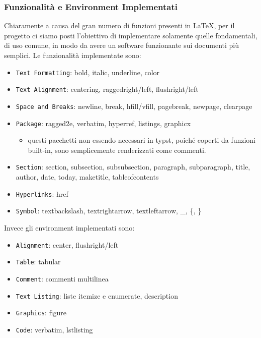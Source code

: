 \documentclass{article}
\begin{document}
    \subsubsection{Funzionalità e Environment Implementati}

    Chiaramente a causa del gran numero di funzioni presenti in LaTeX, per il progetto ci siamo posti l'obiettivo di implementare solamente quelle fondamentali, di uso comune, in modo da avere un software funzionante sui documenti più semplici.
    Le funzionalità implementate sono:
    \begin{itemize}
        \item \texttt{Text Formatting}: bold, italic, underline, color
        \item \texttt{Text Alignment}: centering, raggedright/left, flushright/left
        \item \texttt{Space and Breaks}: newline, break, hfill/vfill, pagebreak, newpage, clearpage
        \item \texttt{Package}: ragged2e, verbatim, hyperref, listings, graphicx \begin{itemize}
                                                                                     \item questi pacchetti non essendo necessari in typst, poiché coperti da funzioni built-in, sono semplicemente renderizzati come commenti.
        \end{itemize}
        \item \texttt{Section}: section, subsection, subsubsection, paragraph, subparagraph, title, author, date, today, maketitle, tableofcontents
        \item \texttt{Hyperlinks}: href
        \item \texttt{Symbol}: textbackslash, textrightarrow, textleftarrow, \_, \{, \}
    \end{itemize}

    Invece gli environment implementati sono:
    \begin{itemize}
        \item \texttt{Alignment}: center, flushright/left
        \item \texttt{Table}: tabular
        \item \texttt{Comment}: commenti multilinea
        \item \texttt{Text Listing}: liste itemize e enumerate, description
        \item \texttt{Graphics}: figure
        \item \texttt{Code}: verbatim, lstlisting
    \end{itemize}
\end{document}

